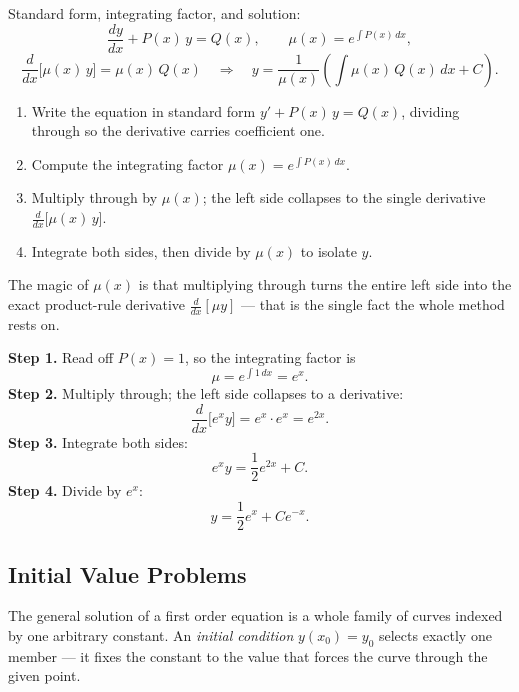 \documentclass[11pt]{article}
\begin{document}
\begin{formulabox}
Standard form, integrating factor, and solution:
\[
    \frac{dy}{dx} + P(x)\,y = Q(x),
    \qquad
    \mu(x) = e^{\int P(x)\,dx},
\]
\[
    \frac{d}{dx}\big[\mu(x)\,y\big] = \mu(x)\,Q(x)
    \quad\Longrightarrow\quad
    y = \frac{1}{\mu(x)}\left( \int \mu(x)\,Q(x)\,dx + C \right).
\]
\end{formulabox}

\begin{methodbox}
\begin{enumerate}[leftmargin=1.6em, itemsep=2pt]
    \item Write the equation in standard form $y' + P(x)\,y = Q(x)$, dividing
          through so the derivative carries coefficient one.
    \item Compute the integrating factor $\mu(x) = e^{\int P(x)\,dx}$.
    \item Multiply through by $\mu(x)$; the left side collapses to the single
          derivative $\frac{d}{dx}\big[\mu(x)\,y\big]$.
    \item Integrate both sides, then divide by $\mu(x)$ to isolate $y$.
\end{enumerate}
\end{methodbox}

\noindent The magic of $\mu(x)$ is that multiplying through turns the entire
left side into the exact product-rule derivative $\frac{d}{dx}[\mu y]$ ---
that is the single fact the whole method rests on.

\begin{examplebox}[Worked Example 2.2: Solve $\frac{dy}{dx} + y = e^{x}$]
\textbf{Step 1.} Read off $P(x) = 1$, so the integrating factor is
\[ \mu = e^{\int 1\,dx} = e^{x}. \]
\textbf{Step 2.} Multiply through; the left side collapses to a derivative:
\[ \frac{d}{dx}\big[e^{x}y\big] = e^{x}\cdot e^{x} = e^{2x}. \]
\textbf{Step 3.} Integrate both sides:
\[ e^{x}y = \frac{1}{2}e^{2x} + C. \]
\textbf{Step 4.} Divide by $e^{x}$:
\[ y = \frac{1}{2}e^{x} + C e^{-x}. \]
\end{examplebox}

\subsection{Initial Value Problems}

The general solution of a first order equation is a whole family of curves
indexed by one arbitrary constant. An \emph{initial condition} $y(x_0) = y_0$
selects exactly one member --- it fixes the constant to the value that forces
the curve through the given point.
\end{document}
